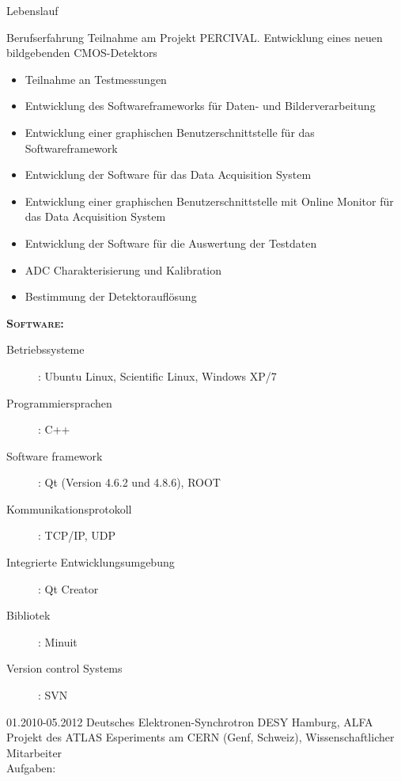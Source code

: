 \documentclass[11pt,a4paper]{scrartcl}
\begin{document}
\begin{cv}{Lebenslauf}
\begin{cvlist}{Berufserfahrung}
Teilnahme am Projekt PERCIVAL. Entwicklung eines neuen
bildgebenden CMOS-Detektors
\begin{itemize}
  \item Teilnahme an Testmessungen
  \item Entwicklung des Softwareframeworks f{\"u}r Daten- und
  Bilderverarbeitung
  \item Entwicklung einer graphischen Benutzerschnittstelle f{\"u}r  das Softwareframework
  \item Entwicklung der Software f{\"u}r das Data Acquisition
  System
  \item Entwicklung einer graphischen Benutzerschnittstelle mit Online
  Monitor f{\"u}r das Data Acquisition System
  \item Entwicklung der Software f{\"u}r die Auswertung der Testdaten
  \item ADC Charakterisierung und Kalibration
  \item Bestimmung der Detektoraufl{\"o}sung
\end{itemize}

{\scshape {\bfseries Software:}}
\begin{description}
\item[Betriebssysteme] : Ubuntu Linux, Scientific Linux, Windows
XP/7
\item[Programmiersprachen] : C++
\item[Software framework] : Qt (Version 4.6.2 und 4.8.6), ROOT
 \item[Kommunikationsprotokoll] : TCP/IP, UDP
\item[Integrierte Entwicklungsumgebung] : Qt Creator
\item[Bibliotek] : Minuit
\item[Version control Systems] : SVN
\end{description}

\vspace{\baselineskip}

\item[01.2010-05.2012] Deutsches Elektronen-Synchrotron DESY
Hamburg, ALFA Projekt des ATLAS Esperiments am CERN (Genf,
Schweiz), Wissenschaftlicher Mitarbeiter \\

Aufgaben:\\


\end{cvlist}
\end{cv}
\end{document}

